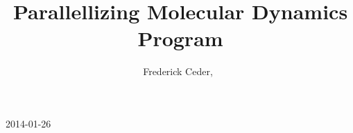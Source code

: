 \documentclass[journal]{IEEEtran}
\begin{document}
%
\title{Parallellizing Molecular Dynamics Program}
%
%
%

\author{Frederick Ceder,~ %
}

% 
%



%
{2014-01-26}
% 




\end{document}
